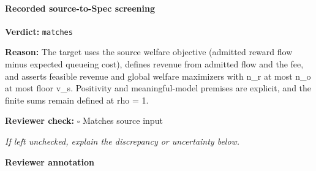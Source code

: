 \documentclass[10pt]{article}
\newcommand{\reviewerbox}{%
  \par\noindent\fbox{\parbox{0.96\linewidth}{\rule{0pt}{0.38in}}}\par
}
\newcommand{\reviewmatch}[1]{%
  \par\noindent\textbf{Reviewer check:} $\square$\; #1\par
  \noindent\emph{If left unchecked, explain the discrepancy or uncertainty below.}\par
}
\begin{document}
\paragraph{Recorded source-to-Spec screening}
\textbf{Verdict:} \texttt{matches}
\\
{\raggedright
\textbf{Reason:} The target uses the source welfare objective (admitted reward flow minus expected queueing cost), defines revenue from admitted flow and the fee, and asserts feasible revenue and global welfare maximizers with n\_\allowbreak{}r at most n\_\allowbreak{}o at most floor v\_\allowbreak{}s.\allowbreak{} Positivity and meaningful-\allowbreak{}model premises are explicit, and the finite sums remain defined at rho = 1.\allowbreak{}
\par}
\reviewmatch{Matches source input}
\noindent\textbf{Reviewer annotation}\par
\reviewerbox
\end{document}
